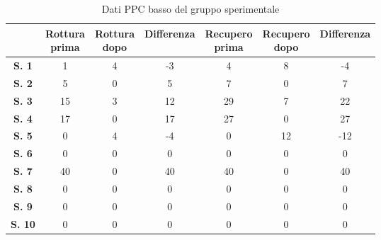 \begin{table}[H]
\begin{center}
\begin{tabular}{|c|c|c|c|c|c|c|} \hline
{\textbf{}} & \pbox{20cm}{\textbf{Rottura} \\ \textbf{prima}} & \pbox{20cm}{\textbf{Rottura} \\ \textbf{dopo}} & \textbf{Differenza} & \pbox{20cm}{\textbf{Recupero} \\ \textbf{prima}} & \pbox{20cm}{\textbf{Recupero} \\ \textbf{dopo}} & \textbf{Differenza} \\ \hline
\textbf{S. 1} & 1 & 4 & -3 & 4 & 8 & -4 \\ \hline
\textbf{S. 2} & 5 & 0 & 5 & 7 & 0 & 7 \\ \hline
\textbf{S. 3} & 15 & 3 & 12 & 29 & 7 & 22  \\ \hline
\textbf{S. 4} & 17 & 0 & 17 & 27 & 0 & 27  \\ \hline
\textbf{S. 5} & 0 & 4 & -4 & 0 & 12 & -12  \\ \hline
\textbf{S. 6} & 0 & 0 & 0 & 0 & 0 & 0 \\ \hline
\textbf{S. 7} & 40 & 0 & 40 & 40 & 0 & 40 \\ \hline
\textbf{S. 8} & 0 & 0 & 0 & 0 & 0 & 0 \\ \hline
\textbf{S. 9} & 0 & 0 & 0 & 0 & 0 & 0 \\ \hline
\textbf{S. 10} & 0 & 0 & 0 & 0 & 0 & 0 \\ \hline

\end{tabular}
\end{center}
\caption{Dati PPC basso del gruppo sperimentale}
\end{table}
\\\ \\\ \\\ \\\ \\\ \\\ \\\ \\\ \\\ \\\ \\\ 

